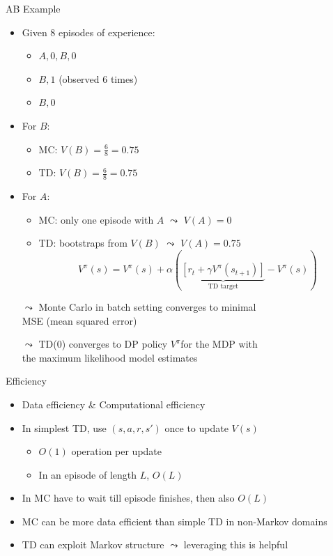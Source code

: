 \documentclass[aspectratio=169]{../latex_main/tntbeamer}  %
\begin{document}
\begin{frame}[c]{AB Example }
	
\begin{itemize}
	\item Given $8$ episodes of experience:
	\begin{itemize}
		\item $A, 0, B, 0$
		\item $B, 1$ (observed $6$ times)
		\item $B, 0$ 
	\end{itemize}
	\item For $B$:
	\begin{itemize}
		\item MC: $V(B) = \frac{6}{8} =  0.75$
		\item TD: $V(B) = \frac{6}{8} =  0.75$
	\end{itemize} 
	\pause
	\item For $A$:
	\begin{itemize}
		\item MC: only one episode with $A$ $\leadsto$ $V(A) = 0$ 
		\item TD: bootstraps from $V(B)$ $\leadsto$ $V(A) = 0.75$
$$ V^\pi(s) = V^\pi(s) + \alpha (\underbrace{[r_t + \gamma V^\pi (s_{t+1})]}_{\text{TD target}} - V^\pi(s))$$
	\end{itemize}	
	\medskip
	\item[$\leadsto$] Monte Carlo in batch setting converges to minimal\\ \alert{MSE} (mean squared error)
	\item[$\leadsto$] TD(0) converges to DP policy $V^\pi$for the MDP with\\ the \alert{maximum likelihood model estimates}
	
\end{itemize}
	
\end{frame}
\begin{frame}[c]{Efficiency}
	
	\begin{itemize}
		\item Data efficiency \& Computational efficiency
		\item In simplest TD, use $(s,a,r,s')$ once to update $V(s)$
		\begin{itemize}
			\item $O(1)$ operation per update
			\item In an episode of length $L$, $O(L)$
		\end{itemize}		
		\item In MC have to wait till episode finishes, then also $O(L)$
		\item MC can be more data efficient than simple TD in non-Markov domains
		\item TD can exploit Markov structure $\leadsto$ leveraging this is helpful
	\end{itemize}
	
\end{frame}
\end{document}

